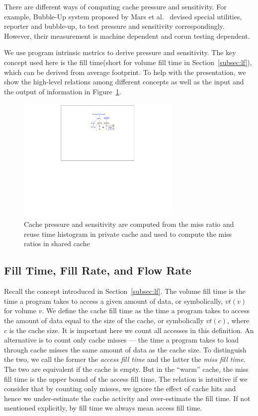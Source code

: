 There are different ways of computing cache pressure and
sensitivity. For example, Bubble-Up system proposed by Mars et
al.~\cite{Mars+:IEEEM12} devised special utilities, reporter and
bubble-up, to test pressure and sensitivity correspondingly. However,
their measurement is machine dependent and corun testing dependent. 

We use program intrinsic metrics to derive pressure and
sensitivity. The key concept used here is the fill time(short for
volume fill time in Section~\ref{subsec:lf}), which can be
derived from average footprint. To help with the presentation, we show
the high-level relations among different concepts as well as the input
and the output of information in Figure~\ref{fig:roadmap}.

\begin{figure}[h!]
\centering
\includegraphics[width=0.7\textwidth,type=pdf,ext=.pdf,read=.pdf]{figures/corun/feeling_roadmap} 
\caption{Cache pressure and sensitivity are computed from the miss ratio and reuse time histogram in private cache and used to compute the miss ratios in shared cache}
\label{fig:roadmap}
\end{figure}

\subsection{Fill Time, Fill Rate, and Flow Rate}
\label{sec:fill_time}

Recall the concept introduced in Section~\ref{subsec:lf}. The volume fill
time is the time a program takes to access a given amount of data, or
symbolically, $vt(v)$ for volume $v$. We define the cache fill time as
the time a program takes to access the amount of data equal to the
size of the cache, or symbolically $vt(c)$, where $c$ is the cache
size.  It is important here we count all accesses in this definition.
An alternative is to count only cache misses --- the time a program
takes to load through cache misses the same amount of data as the
cache size.  To distinguish the two, we call the former the
\emph{access fill time} and the latter the \emph{miss fill time}.  The
two are equivalent if the cache is empty.  But in the ``warm'' cache,
the miss fill time is the upper bound of the access fill time.  The
relation is intuitive if we consider that by counting only misses, we
ignore the effect of cache hits and hence we under-estimate the cache
activity and over-estimate the fill time. If not mentioned
explicitly, by fill time we always mean access fill time.

